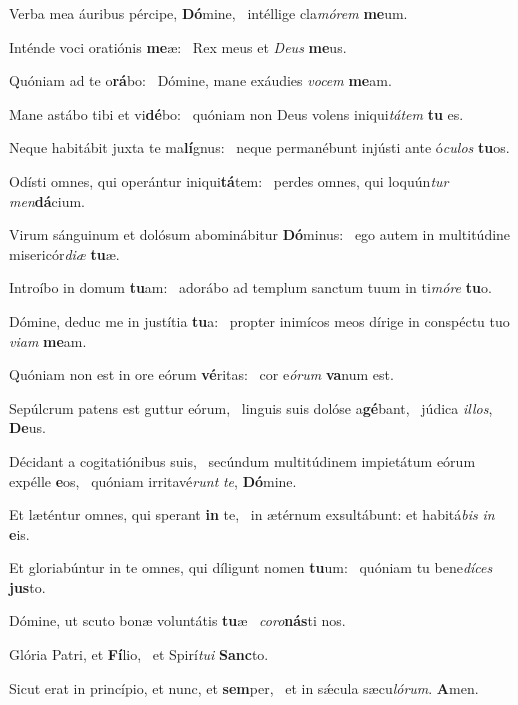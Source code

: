 \item Verba mea áuribus pércipe, \textbf{Dó}mine,~\psstar{} intéllige cla\textit{mórem} \textbf{me}um.
\item Inténde voci oratiónis \textbf{me}æ:~\psstar{} Rex meus et \textit{Deus} \textbf{me}us.
\item Quóniam ad te o\textbf{rá}bo:~\psstar{} Dómine, mane exáudies \textit{vocem} \textbf{me}am.
\item Mane astábo tibi et vi\textbf{dé}bo:~\psstar{} quóniam non Deus volens iniqui\textit{tátem} \textbf{tu} es.
\item Neque habitábit juxta te ma\textbf{lí}gnus:~\psstar{} neque permanébunt injústi ante ó\textit{culos} \textbf{tu}os.
\item Odísti omnes, qui operántur iniqui\textbf{tá}tem:~\psstar{} perdes omnes, qui loquún\textit{tur} \textit{men}\textbf{dá}cium.
\item Virum sánguinum et dolósum abominábitur \textbf{Dó}minus:~\psstar{} ego autem in multitúdine misericór\textit{diæ} \textbf{tu}æ.
\item Introíbo in domum \textbf{tu}am:~\psstar{} adorábo ad templum sanctum tuum in ti\textit{móre} \textbf{tu}o.
\item Dómine, deduc me in justítia \textbf{tu}a:~\psstar{} propter inimícos meos dírige in conspéctu tuo \textit{viam} \textbf{me}am.
\item Quóniam non est in ore eórum \textbf{vé}ritas:~\psstar{} cor e\textit{órum} \textbf{va}num est.
\item Sepúlcrum patens est guttur eórum,~\pscross{} linguis suis dolóse a\textbf{gé}bant,~\psstar{} júdica \textit{illos}, \textbf{De}us.
\item Décidant a cogitatiónibus suis,~\pscross{} secúndum multitúdinem impietátum eórum expélle \textbf{e}os,~\psstar{} quóniam irritavé\textit{runt} \textit{te}, \textbf{Dó}mine.
\item Et læténtur omnes, qui sperant \textbf{in} te,~\psstar{} in ætérnum exsultábunt: et habitá\textit{bis} \textit{in} \textbf{e}is.
\item Et gloriabúntur in te omnes, qui díligunt nomen \textbf{tu}um:~\psstar{} quóniam tu bene\textit{díces} \textbf{jus}to.
\item Dómine, ut scuto bonæ voluntátis \textbf{tu}æ~\psstar{} \textit{coro}\textbf{nás}ti nos.
\item Glória Patri, et \textbf{Fí}lio,~\psstar{} et Spirí\textit{tui} \textbf{Sanc}to.
\item Sicut erat in princípio, et nunc, et \textbf{sem}per,~\psstar{} et in sǽcula sæcu\textit{lórum}. \textbf{A}men.
